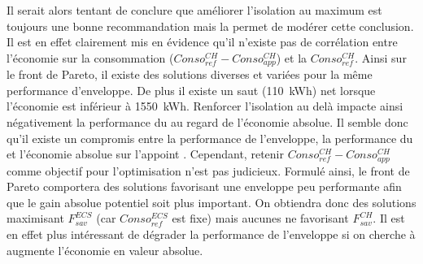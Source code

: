 Il serait alors tentant de conclure que améliorer l’isolation au maximum est
toujours une bonne recommandation mais la  permet
de modérer cette conclusion. Il est en effet clairement mis en évidence
qu’il n’existe pas de corrélation entre l’économie sur la consommation
($Conso_{ref}^{CH} - Conso_{app}^{CH}$) et la $Conso_{ref}^{CH}$. Ainsi sur le front de Pareto, il existe des solutions diverses
et variées pour la même performance d’enveloppe. De plus il existe un saut (\SI{110}{kWh})
net lorsque l’économie est inférieur à \SI{1550}{kWh}. Renforcer l’isolation
au delà impacte ainsi négativement la performance du  au regard de l’économie
absolue. Il semble donc qu’il existe un compromis entre la performance de l’enveloppe,
la performance du  et l’économie absolue sur l’appoint .
Cependant, retenir $Conso_{ref}^{CH} - Conso_{app}^{CH}$ comme objectif
pour l’optimisation n’est pas judicieux. Formulé ainsi, le front de Pareto
comportera des solutions favorisant une enveloppe peu performante afin que le gain
absolue potentiel soit plus important. On obtiendra donc des solutions
maximisant $F_{sav}^{ECS}$ (car $Conso_{ref}^{ECS}$ est fixe) mais aucunes ne
favorisant $F_{sav}^{CH}$. Il est en effet plus intéressant de dégrader la performance
de l’enveloppe si on cherche à augmente l’économie en valeur absolue.

